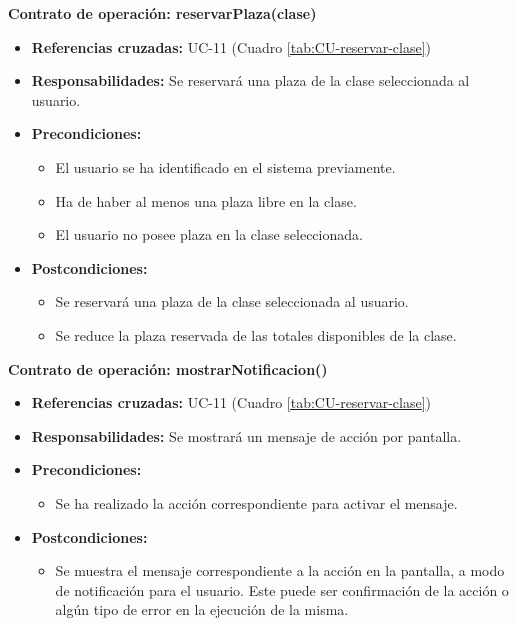 \textbf{Contrato de operación: reservarPlaza(clase)}
\begin{itemize}
\item \textbf{Referencias cruzadas:} UC-11 (Cuadro \ref{tab:CU-reservar-clase})
\item \textbf{Responsabilidades:} Se reservará una plaza de la clase seleccionada al usuario.
\item \textbf{Precondiciones:} 
 \begin{itemize}
\item El usuario se ha identificado en el sistema previamente.
\item Ha de haber al menos una plaza libre en la clase.
\item El usuario no posee plaza en la clase seleccionada.
\end {itemize}
\item \textbf{Postcondiciones:} 
 \begin{itemize}
\item Se reservará una plaza de la clase seleccionada al usuario.
\item Se reduce la plaza reservada de las totales disponibles de la clase.
\end {itemize}
\end {itemize}

\textbf{Contrato de operación: mostrarNotificacion()}
\begin{itemize}
\item \textbf{Referencias cruzadas:} UC-11 (Cuadro \ref{tab:CU-reservar-clase})
\item \textbf{Responsabilidades:} Se mostrará un mensaje de acción por pantalla.
\item \textbf{Precondiciones:} 
 \begin{itemize}
\item Se ha realizado la acción correspondiente para activar el mensaje.
\end {itemize}
\item \textbf{Postcondiciones:} 
 \begin{itemize}
\item Se muestra el mensaje correspondiente a la acción en la pantalla, a modo de notificación para el usuario. Este puede ser confirmación de la acción o algún tipo de error en la ejecución de la misma.
\end {itemize}
\end {itemize}


\vspace{7mm}
\dotfill
\vspace{7mm}


